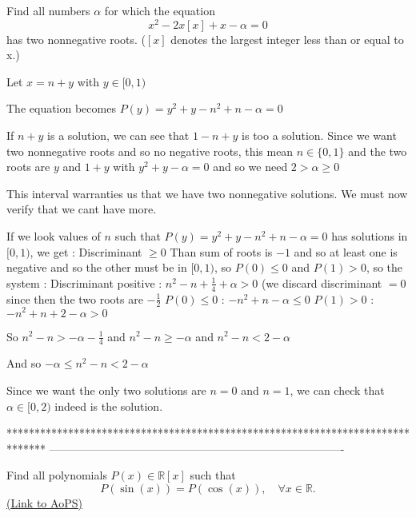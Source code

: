 \begin{solution}
	\begin{tcolorbox}Find all numbers $\alpha$ for which the equation
\[x^2 - 2x[x] + x -\alpha = 0\]
has two nonnegative roots. ($[x]$ denotes the largest integer less than or equal to x.)\end{tcolorbox}
Let $x=n+y$ with $y\in[0,1)$ 

The equation becomes $P(y)=y^2+y-n^2+n-\alpha=0$

If $n+y$ is a solution, we can see that $1-n+y$ is too a solution.
Since we want two nonnegative roots and so no negative roots, this mean $n\in\{0,1\}$ and the two roots are $y$ and $1+y$ with $y^2+y-\alpha=0$ and so we need $2>\alpha\ge 0$

This interval warranties us that we have two nonnegative solutions.
We must now verify that we cant have more.

If we look values of $n$ such that $P(y)=y^2+y-n^2+n-\alpha=0$ has solutions in $[0,1)$, we get :
Discriminant $\ge 0$ 
Than sum of roots is $-1$ and so at least one is negative and so the other must be in $[0,1)$, so $P(0)\le 0$ and $P(1)>0$, so the system :
Discriminant positive : $n^2-n+\frac 14+\alpha>0$ (we discard discriminant $=0$ since then the two roots are $-\frac 12$
$P(0)\le 0$ : $-n^2+n-\alpha\le 0$
$P(1)>0$ : $-n^2+n+2-\alpha>0$

So $n^2-n>-\alpha-\frac 14$ and $n^2-n\ge -\alpha$ and $n^2-n<2-\alpha$

And so $-\alpha\le n^2-n<2-\alpha$

Since we want the only two solutions are $n=0$ and $n=1$, we can check that $\boxed{\alpha\in[0,2)}$ indeed is the solution.
\end{solution}
*******************************************************************************
-------------------------------------------------------------------------------

\begin{problem}
	Find all polynomials $P(x)\in{\mathbb{R}{[x]}}$ such that
\[P(\sin(x))=P(\cos(x)), \quad \forall x \in \mathbb R.\]
	\flushright \href{https://artofproblemsolving.com/community/c6h372639}{(Link to AoPS)}
\end{problem}



